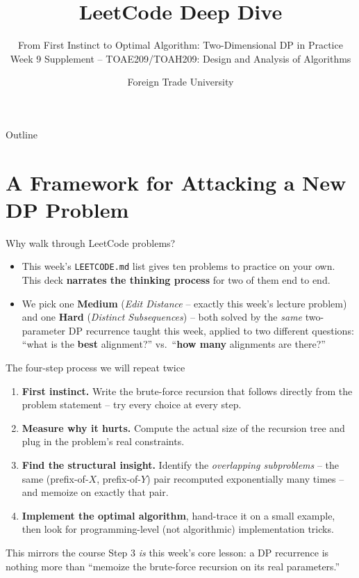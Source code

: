 \documentclass[11pt,aspectratio=169]{beamer}
\title{LeetCode Deep Dive}
\subtitle{From First Instinct to Optimal Algorithm: Two-Dimensional DP in Practice\\
\small Week 9 Supplement -- TOAE209/TOAH209: Design and Analysis of Algorithms}
\author{Foreign Trade University}
\date{}
\begin{document}
\begin{frame}
  \titlepage
\end{frame}

\begin{frame}{Outline}
  \tableofcontents
\end{frame}

\section{A Framework for Attacking a New DP Problem}

\begin{frame}{Why walk through LeetCode problems?}
  \begin{itemize}
    \item This week's \texttt{LEETCODE.md} list gives ten problems to practice on your
    own. This deck \textbf{narrates the thinking process} for two of them end to end.
    \item We pick one \textcolor{blue!50!black}{\textbf{Medium}} (\emph{Edit Distance} --
    exactly this week's lecture problem) and one \textcolor{red!60!black}{\textbf{Hard}}
    (\emph{Distinct Subsequences}) -- both solved by the \emph{same} two-parameter DP
    recurrence taught this week, applied to two different questions: ``what is the
    \textbf{best} alignment?'' vs.\ ``\textbf{how many} alignments are there?''
  \end{itemize}
\end{frame}

\begin{frame}{The four-step process we will repeat twice}
  \begin{enumerate}
    \item \textbf{First instinct.} Write the brute-force recursion that follows directly
    from the problem statement -- try every choice at every step.
    \item \textbf{Measure why it hurts.} Compute the actual size of the recursion tree
    and plug in the problem's real constraints.
    \item \textbf{Find the structural insight.} Identify the \emph{overlapping
    subproblems} -- the same (prefix-of-$X$, prefix-of-$Y$) pair recomputed exponentially
    many times -- and memoize on exactly that pair.
    \item \textbf{Implement the optimal algorithm}, hand-trace it on a small example,
    then look for programming-level (not algorithmic) implementation tricks.
  \end{enumerate}
  \begin{alertblock}{This mirrors the course}
    Step 3 \emph{is} this week's core lesson: a DP recurrence is nothing more than
    ``memoize the brute-force recursion on its real parameters.''
  \end{alertblock}
\end{frame}
\end{document}

